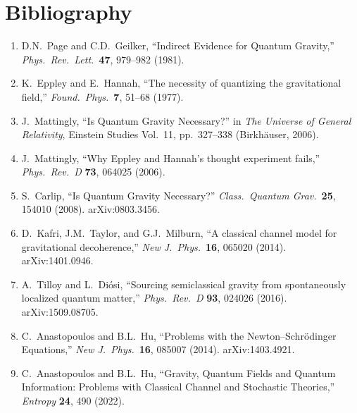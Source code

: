\documentclass[12pt,a4paper]{article}
\begin{document}
\section*{Bibliography}
\label{sec:bibliography}

\begin{enumerate}
\item D.N.\ Page and C.D.\ Geilker, ``Indirect Evidence for Quantum Gravity,'' \textit{Phys.\ Rev.\ Lett.}\ \textbf{47}, 979--982 (1981).

\item K.\ Eppley and E.\ Hannah, ``The necessity of quantizing the gravitational field,'' \textit{Found.\ Phys.}\ \textbf{7}, 51--68 (1977).

\item J.\ Mattingly, ``Is Quantum Gravity Necessary?'' in \textit{The Universe of General Relativity}, Einstein Studies Vol.\ 11, pp.\ 327--338 (Birkh\"auser, 2006).

\item J.\ Mattingly, ``Why Eppley and Hannah's thought experiment fails,'' \textit{Phys.\ Rev.\ D} \textbf{73}, 064025 (2006).

\item S.\ Carlip, ``Is Quantum Gravity Necessary?'' \textit{Class.\ Quantum Grav.}\ \textbf{25}, 154010 (2008). arXiv:0803.3456.

\item D.\ Kafri, J.M.\ Taylor, and G.J.\ Milburn, ``A classical channel model for gravitational decoherence,'' \textit{New J.\ Phys.}\ \textbf{16}, 065020 (2014). arXiv:1401.0946.

\item A.\ Tilloy and L.\ Di\'osi, ``Sourcing semiclassical gravity from spontaneously localized quantum matter,'' \textit{Phys.\ Rev.\ D} \textbf{93}, 024026 (2016). arXiv:1509.08705.

\item C.\ Anastopoulos and B.L.\ Hu, ``Problems with the Newton--Schr\"odinger Equations,'' \textit{New J.\ Phys.}\ \textbf{16}, 085007 (2014). arXiv:1403.4921.

\item C.\ Anastopoulos and B.L.\ Hu, ``Gravity, Quantum Fields and Quantum Information: Problems with Classical Channel and Stochastic Theories,'' \textit{Entropy} \textbf{24}, 490 (2022).


\end{enumerate}
\end{document}
